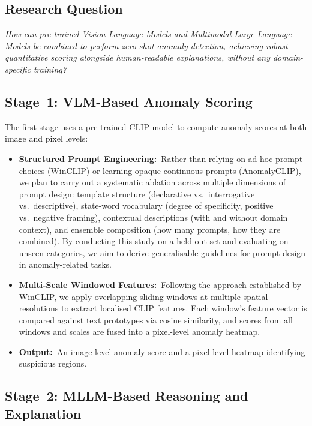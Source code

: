 \documentclass[conference]{IEEEtran}
\begin{document}
\subsection{Research Question}

\textit{How can pre-trained Vision-Language Models and Multimodal Large Language Models be combined to perform zero-shot anomaly detection, achieving robust quantitative scoring alongside human-readable explanations, without any domain-specific training?}

\subsection{Stage~1: VLM-Based Anomaly Scoring}

The first stage uses a pre-trained CLIP model to compute anomaly scores at both image and pixel levels:
\begin{itemize}[leftmargin=*, itemsep=2pt]
    \item \textbf{Structured Prompt Engineering:}\ Rather than relying on ad-hoc prompt choices (WinCLIP) or learning opaque continuous prompts (AnomalyCLIP), we plan to carry out a systematic ablation across multiple dimensions of prompt design: template structure (declarative vs.\ interrogative vs.\ descriptive), state-word vocabulary (degree of specificity, positive vs.\ negative framing), contextual descriptions (with and without domain context), and ensemble composition (how many prompts, how they are combined). By conducting this study on a held-out set and evaluating on unseen categories, we aim to derive generalisable guidelines for prompt design in anomaly-related tasks.
    \item \textbf{Multi-Scale Windowed Features:}\ Following the approach established by WinCLIP, we apply overlapping sliding windows at multiple spatial resolutions to extract localised CLIP features. Each window's feature vector is compared against text prototypes via cosine similarity, and scores from all windows and scales are fused into a pixel-level anomaly heatmap.
    \item \textbf{Output:}\ An image-level anomaly score and a pixel-level heatmap identifying suspicious regions.
\end{itemize}

\subsection{Stage~2: MLLM-Based Reasoning and Explanation}
\end{document}
